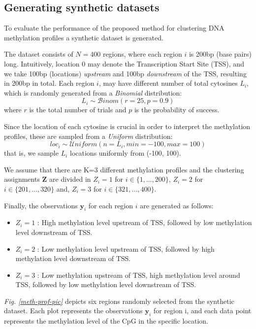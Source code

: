 \subsection{Generating synthetic datasets} \label{meth-synth-data-subsect}
To evaluate the performance of the proposed method for clustering DNA methylation profiles a synthetic dataset is generated. 

The dataset consists of $N=400$ regions, where each region $i$ is 200bp (base pairs) long. Intuitively, location 0 may denote the Transcription Start Site (TSS), and we take 100bp (\ie locations) \emph{upstream} and 100bp \emph{downstream} of the TSS, resulting in 200bp in total. Each region $i$, may have different number of total cytosines $L_{i}$, which is randomly generated from a \emph{Binomial} distribution:
\begin{equation}
	L_{i} \sim \mathcal{B}inom(r=25, p=0.9)
\end{equation}
where $r$ is the total number of trials and $p$ is the probability of success.

Since the location of each cytosine is crucial in order to interpret the methylation profiles, these are sampled from a \emph{Uniform} distribution:
\begin{equation}
	loc_{i} \sim \mathcal{U}niform(n=L_{i}, min=-100, max=100)
\end{equation}
that is, we sample $L_{i}$ locations uniformly from (-100, 100). 

We assume that there are K=3 different methylation profiles and the clustering assignments $\mathbf{Z}$ are divided in $Z_{i}=1$ for $i \in \lbrace 1,...,200 \rbrace$, $Z_{i}=2$ for $i \in \lbrace 201,...,320 \rbrace$ and, $Z_{i}=3$ for $i \in \lbrace 321,...,400 \rbrace$. 

Finally, the observations $\mathbf{y}_{i}$ for each region $i$ are generated as follows:
\begin{itemize}
	\item{
		$Z_{i}=1$ : High methylation level upstream of TSS, followed by low methylation level downstream of TSS.
	}
	\item{ 
		$Z_{i}=2$ : Low methylation level upstream of TSS, followed by high methylation level downstream of TSS.
	}
	\item{ 
		$Z_{i}=3$ : Low methylation upstream of TSS, high methylation level around TSS, followed by low methylation level downstream of TSS.
	}
\end{itemize}

\emph{Fig. \ref{meth-prof-pic}} depicts six regions randomly selected from the synthetic dataset. Each plot represents the observations $\mathbf{y}_{i}$ for region i, and each data point represents the methylation level of the CpG in the specific location.

